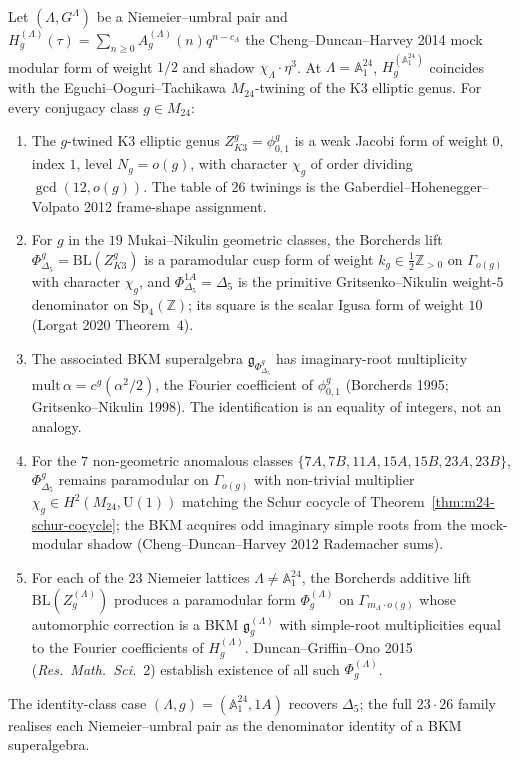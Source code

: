 \begin{theorem}
\label{thm:mathieu-umbral-borcherds-lift}
Let $(\Lambda, G^\Lambda)$ be a Niemeier--umbral pair and
$H^{(\Lambda)}_g(\tau) = \sum_{n\geq 0} A^{(\Lambda)}_g(n)q^{n-c_\Lambda}$ the
Cheng--Duncan--Harvey 2014 mock modular form of weight $1/2$ and shadow
$\chi_\Lambda\cdot\eta^3$. At $\Lambda = \mathbb{A}_1^{24}$, $H^{(\mathbb{A}_1^{24})}_g$
coincides with the Eguchi--Ooguri--Tachikawa $M_{24}$-twining of the K3
elliptic genus. For every conjugacy class $g\in M_{24}$:
\begin{enumerate}[leftmargin=2em]
\item The $g$-twined K3 elliptic genus $Z^g_{K3} = \phi^g_{0,1}$ is a weak
Jacobi form of weight $0$, index $1$, level $N_g = o(g)$, with character
$\chi_g$ of order dividing $\gcd(12, o(g))$. The table of $26$ twinings is
the Gaberdiel--Hohenegger--Volpato 2012 frame-shape assignment.
\item For $g$ in the $19$ Mukai--Nikulin geometric classes, the Borcherds
lift $\Phi^g_{\Delta_5} = \mathrm{BL}(Z^g_{K3})$ is a paramodular cusp form
of weight $k_g\in\frac12\mathbb{Z}_{>0}$ on $\Gamma_{o(g)}$ with character
$\chi_g$, and $\Phi^{1A}_{\Delta_5} = \Delta_5$ is the primitive
Gritsenko--Nikulin weight-$5$ denominator on $\mathrm{Sp}_4(\mathbb{Z})$;
its square is the scalar Igusa form of weight $10$ (Lorgat 2020
Theorem~$4$).
\item The associated BKM superalgebra $\mathfrak{g}_{\Phi^g_{\Delta_5}}$ has
imaginary-root multiplicity $\mathrm{mult}\,\alpha = c^g(\alpha^2/2)$, the
Fourier coefficient of $\phi^g_{0,1}$ (Borcherds 1995; Gritsenko--Nikulin
1998). The identification is an equality of integers, not an analogy.
\item For the $7$ non-geometric anomalous classes
$\{7A, 7B, 11A, 15A, 15B, 23A, 23B\}$, $\Phi^g_{\Delta_5}$ remains
paramodular on $\Gamma_{o(g)}$ with non-trivial multiplier
$\chi_g\in H^2(M_{24}, \mathrm{U}(1))$ matching the Schur cocycle of
Theorem~\ref{thm:m24-schur-cocycle}; the BKM acquires odd imaginary simple
roots from the mock-modular shadow (Cheng--Duncan--Harvey 2012 Rademacher
sums).
\item For each of the $23$ Niemeier lattices $\Lambda\ne\mathbb{A}_1^{24}$,
the Borcherds additive lift $\mathrm{BL}(Z^{(\Lambda)}_g)$ produces a
paramodular form $\Phi^{(\Lambda)}_g$ on $\Gamma_{m_\Lambda\cdot o(g)}$
whose automorphic correction is a BKM $\mathfrak{g}^{(\Lambda)}_g$ with
simple-root multiplicities equal to the Fourier coefficients of
$H^{(\Lambda)}_g$. Duncan--Griffin--Ono 2015 (\emph{Res.~Math.~Sci.}~2)
establish existence of all such $\Phi^{(\Lambda)}_g$.
\end{enumerate}
The identity-class case $(\Lambda, g) = (\mathbb{A}_1^{24}, 1A)$ recovers
$\Delta_5$; the full $23\cdot 26$ family realises each Niemeier--umbral pair
as the denominator identity of a BKM superalgebra.
\end{theorem}


